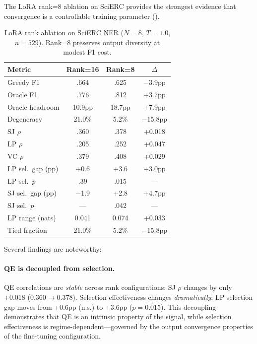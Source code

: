 \documentclass[11pt,a4paper]{article}
\begin{document}
The LoRA rank=8 ablation on SciERC provides the strongest evidence that convergence is a controllable training parameter ().

\begin{table}[t]
\centering
\small
\caption{LoRA rank ablation on SciERC NER ($N{=}8$, $T{=}1.0$, $n{=}529$). Rank=8 preserves output diversity at modest F1 cost.}
\label{tab:ablation}
\begin{tabular}{lccc}
\toprule
\textbf{Metric} & \textbf{Rank=16} & \textbf{Rank=8} & \textbf{$\Delta$} \\
\midrule
Greedy F1           & .664   & .625   & $-$3.9pp \\
Oracle F1           & .776   & .812   & +3.7pp \\
Oracle headroom     & 10.9pp & 18.7pp & +7.9pp \\
Degeneracy          & 21.0\% &  5.2\% & $-$15.8pp \\
\midrule
SJ $\rho$           & .360   & .378   & +0.018 \\
LP $\rho$           & .205   & .252   & +0.047 \\
VC $\rho$           & .379   & .408   & +0.029 \\
\midrule
LP sel.\ gap (pp)   & +0.6   & +3.6   & +3.0pp \\
LP sel.\ $p$        & .39    & .015   & --- \\
SJ sel.\ gap (pp)   & $-$1.9 & +2.8   & +4.7pp \\
SJ sel.\ $p$        & ---    & .042   & --- \\
\midrule
LP range (nats)     & 0.041  & 0.074  & +0.033 \\
Tied fraction       & 21.0\% &  5.2\% & $-$15.8pp \\
\bottomrule
\end{tabular}
\end{table}

Several findings are noteworthy:

\paragraph{QE is decoupled from selection.}
QE correlations are \emph{stable} across rank configurations: SJ $\rho$ changes by only +0.018 (0.360$\to$0.378).
Selection effectiveness changes \emph{dramatically}: LP selection gap moves from +0.6pp (n.s.) to +3.6pp ($p{=}0.015$).
This decoupling demonstrates that QE is an intrinsic property of the signal, while selection effectiveness is regime-dependent---governed by the output convergence properties of the fine-tuning configuration.
\end{document}
